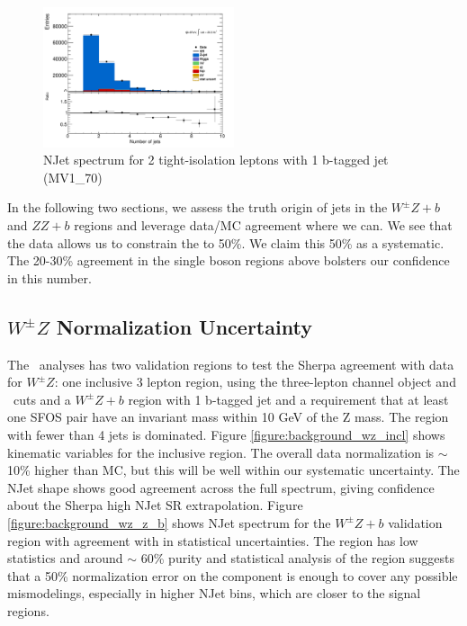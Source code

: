\begin{figure}[!htbp]
\centering \includegraphics[width=0.5\textwidth]{figs/wz/ZbVR}
\caption{NJet spectrum for 2 tight-isolation leptons with 1 b-tagged jet (MV1\_70)} 
\label{figure:background_wz_zb}
\end{figure} 

In the following two sections, we assess the truth origin of jets in the $W^{\pm}Z+b$ and $ZZ+b$ regions and leverage data/MC agreement where we can. We see that the data allows us to constrain the \WZ to 50\%. We claim this 50\% as a systematic. The 20-30\% agreement in the single boson regions above bolsters our confidence in this number. 

\subsection{$W^{\pm}Z$ Normalization Uncertainty} 
The \tth\ analyses has two validation regions to test the Sherpa agreement with data for $W^{\pm}Z$: one inclusive 3 lepton region, using the three-lepton channel object and \pt\ cuts and a $W^{\pm}Z+b$ region with 1 b-tagged jet and a requirement that at least one SFOS pair have an invariant mass within 10 GeV of the Z mass. The region with fewer than 4 jets is \WZ dominated. Figure \ref{figure:background_wz_incl} shows kinematic variables for the inclusive region. The overall data normalization is $\sim$10\% higher than MC, but this will be well within our systematic uncertainty. The NJet shape shows good agreement across the full spectrum, giving confidence about the Sherpa high NJet SR extrapolation. Figure \ref{figure:background_wz_z_b} shows NJet spectrum for the $W^{\pm}Z+b$ validation region with agreement with in statistical uncertainties. The region has low statistics and around $\sim$ 60\% purity and statistical analysis of the region suggests that a 50\% normalization error on the \WZ component is enough to cover any possible mismodelings, especially in higher NJet bins, which are closer to the signal regions.  

